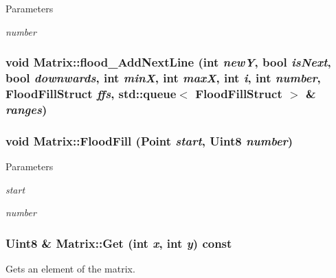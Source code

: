 \begin{DoxyParams}{Parameters}
\item[{\em number}]\end{DoxyParams}
\hypertarget{classMatrix_aaa3962d9bf27f654bd6771a8d5bfaeac}{
\subsubsection[{flood\_\-AddNextLine}]{\setlength{\rightskip}{0pt plus 5cm}void Matrix::flood\_\-AddNextLine (int {\em newY}, \/  bool {\em isNext}, \/  bool {\em downwards}, \/  int {\em minX}, \/  int {\em maxX}, \/  int {\em i}, \/  int {\em number}, \/  {\bf FloodFillStruct} {\em ffs}, \/  std::queue$<$ {\bf FloodFillStruct} $>$ \& {\em ranges})}}
\label{classMatrix_aaa3962d9bf27f654bd6771a8d5bfaeac}
\hypertarget{classMatrix_a7209ed0123ff3686f0d0f7f4e6ac7094}{
\subsubsection[{FloodFill}]{\setlength{\rightskip}{0pt plus 5cm}void Matrix::FloodFill ({\bf Point} {\em start}, \/  Uint8 {\em number})}}
\label{classMatrix_a7209ed0123ff3686f0d0f7f4e6ac7094}

\begin{DoxyParams}{Parameters}
\item[{\em start}]\item[{\em number}]\end{DoxyParams}
\hypertarget{classMatrix_a06fc8df480cd88daf69eaa05867cb7bd}{
\subsubsection[{Get}]{\setlength{\rightskip}{0pt plus 5cm}Uint8 \& Matrix::Get (int {\em x}, \/  int {\em y}) const}}
\label{classMatrix_a06fc8df480cd88daf69eaa05867cb7bd}


Gets an element of the matrix. 


